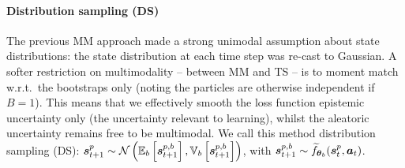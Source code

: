 \vspace{-5pt}
	\paragraph{Distribution sampling (DS)}
    The previous MM approach made a strong unimodal assumption about state distributions: the state distribution at each time step was re-cast to Gaussian.
        A softer restriction on multimodality -- between MM and TS -- is to moment match w.r.t.\ the bootstraps only (noting the particles are otherwise independent if $B=1$).
    This means that we effectively smooth the loss function \wrt{} epistemic uncertainty only (the uncertainty relevant to learning), whilst the aleatoric uncertainty remains free to be multimodal. 
    We call this method distribution sampling (DS):
$\boldsymbol{s}_{t+1}^{p} \sim \mathcal{N} \left( \mathbb{E}_b\left[\boldsymbol{s}_{t+1}^{p,b}\right], \mathbb{V}_b\left[\boldsymbol{s}_{t+1}^{p,b}\right] \right)$, with $\boldsymbol{s}_{t+1}^{p,b} \sim \widetilde{f}_{\boldsymbol{\theta}_b}(\boldsymbol{s}_{t}^{p}, \boldsymbol{a}_{t})$.

		
